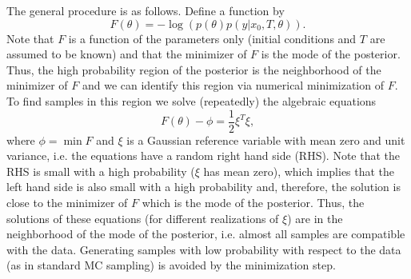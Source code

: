 \documentclass[11pt]{article}
\begin{document}
The general procedure is as follows. Define a function by
\begin{equation}
	F(\theta)= -\log \left(p(\theta)p(y|x_0,T,\theta)\right).
\end{equation}
Note that $F$ is a function of the parameters only (initial conditions and $T$ are assumed to be known) and that the minimizer of $F$ is the mode of the posterior. Thus, the high probability region of the posterior is the neighborhood of the minimizer of $F$ and we can identify this region via numerical minimization of $F$. To find samples in this region we solve (repeatedly) the algebraic equations
\begin{equation}
	F(\theta)-\phi = \frac{1}{2}\xi^T\xi,
\end{equation}
where $\phi = \min F$ and $\xi$ is a Gaussian reference variable with mean zero and unit variance, i.e. the equations have a random right hand side (RHS). Note that the RHS is small with a high probability ($\xi$ has mean zero), which implies that the left hand side is also small with a high probability and, therefore, the solution is close to the minimizer of $F$ which is the mode of the posterior. Thus, the solutions of these equations (for different realizations of $\xi$) are in the neighborhood of the mode of the posterior, i.e. almost all samples are compatible with the data. Generating samples with low probability with respect to the data (as in standard MC sampling) is avoided by the minimization step. 
\end{document}
